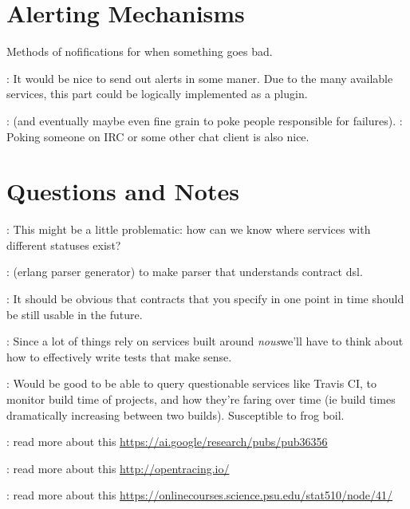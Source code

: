 \documentclass[12pt,twoside]{article}
\newcommand{\projectname}[0]{\textit{nous}}
\begin{document}
\section{Alerting Mechanisms}
Methods of nofifications for when something goes bad.
\begin{itemize}
  : It would be nice to send out
    alerts in some maner. Due to the many available services, this
    part could be logically implemented as a plugin.
  \begin{itemize}
    : (and eventually maybe even fine grain to
      poke people responsible for failures).
    : Poking someone on IRC or some
      other chat client is also nice.
  \end{itemize}
\end{itemize}

\section{Questions and Notes}
\begin{itemize}
  : This might be a little problematic: how can
    we know where services with different statuses exist?

  : (erlang parser generator) to make parser that
    understands contract dsl.

  : It should be obvious that
    contracts that you specify in one point in time should be still
    usable in the future.

  : Since a lot of things rely on services
    built around \projectname we'll have to think about how to
    effectively write tests that make sense.

  : Would be good to be able to query
    questionable services like Travis CI, to monitor build time of
    projects, and how they're faring over time (ie build times
    dramatically increasing between two builds). Susceptible to frog
    boil.

  : read more about this \url{https://ai.google/research/pubs/pub36356}

  : read more about this \url{http://opentracing.io/}

  : read more about this \url{https://onlinecourses.science.psu.edu/stat510/node/41/}

\end{itemize}
\end{document}
